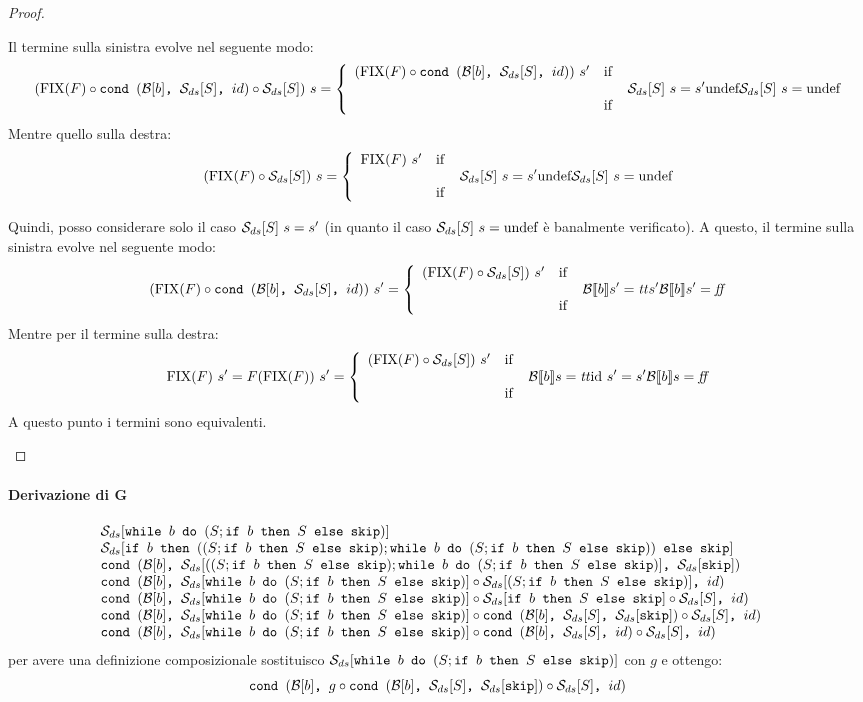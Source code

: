{\begin{proof}
\begin{itemize}
  Il termine sulla sinistra evolve nel seguente modo:
  $$
  (\fixp{F} \circ \cond{b}{\dsCtxt{S}}{id} \circ \dsCtxt{S})\ s =
    \caseFun{(\fixp{F} \circ
                 \cond{b}{\dsCtxt{S}}{id})\ s'}
            {\dsCtxt{S}\ s = s'}
            {\undefDS}
            {\dsCtxt{S}\ s = \undefDS}
  $$
  Mentre quello sulla destra:
  $$
  (\fixp{F} \circ \dsCtxt{S})\ s =
    \caseFun{\fixp{F}\ s'}
            {\dsCtxt{S}\ s = s'}
            {\undefDS}
            {\dsCtxt{S}\ s = \undefDS}
  $$

  Quindi, posso considerare solo il caso $\dsCtxt{S}\ s = s'$ (in quanto il
  caso $\dsCtxt{S}\ s = \undefDS$ è banalmente verificato). A questo, il
  termine sulla sinistra evolve nel seguente modo:
  $$
  (\fixp{F} \circ \cond{b}{\dsCtxt{S}}{id})\ s' =
    \caseFun{(\fixp{F} \circ \dsCtxt{S})\ s'}
            {\B{b}' = \semtrue}
            {s'}
            {\B{b}' = \semfalse}
  $$
  Mentre per il termine sulla destra:
  $$
  \fixp{F}\ s' = F(\fixp{F})\ s' =
    \caseFun{(\fixp{F} \circ \dsCtxt{S})\ s'}
            {\B{b} = \semtrue}
            {\idDS\ s' = s'}
            {\B{b} = \semfalse}
  $$
  A questo punto i termini sono equivalenti.
\end{itemize}

\end{proof}

\paragraph{Derivazione di G}
$$
\begin{array}{ll}
\dsCtxt{\wbS{b}{(S; \ifABC{b}{S}{\skipForFriends})}} & \\
\dsCtxt{\ifABC{b}{((S;  \ifABC{b}{S}{\skipForFriends}); \wbS{b}{(S; \ifABC{b}{S}{\skipForFriends})} )}{\skipForFriends}} & \\
\cond{b}{\dsCtxt{((S;  \ifABC{b}{S}{\skipForFriends}); \wbS{b}{(S; \ifABC{b}{S}{\skipForFriends})}}}{\dsCtxt{\skipForFriends}} \\
\cond{b}{\dsCtxt{\wbS{b}{(S; \ifABC{b}{S}{\skipForFriends})}} \circ \dsCtxt{(S;  \ifABC{b}{S}{\skipForFriends})}}{id} & \\
\cond{b}{\dsCtxt{\wbS{b}{(S; \ifABC{b}{S}{\skipForFriends})}} \circ \dsCtxt{\ifABC{b}{S}{\skipForFriends}} \circ \dsCtxt{S} }{id} & \\
\cond{b}{\dsCtxt{\wbS{b}{(S; \ifABC{b}{S}{\skipForFriends})}} \circ \cond{b}{\dsCtxt{S}}{\dsCtxt{\skipForFriends}} \circ \dsCtxt{S} }{id} & \\
\cond{b}{\dsCtxt{\wbS{b}{(S; \ifABC{b}{S}{\skipForFriends})}} \circ \cond{b}{\dsCtxt{S}}{id} \circ \dsCtxt{S} }{id} & \\
\end{array}
$$
per avere una definizione composizionale sostituisco $\dsCtxt{\wbS{b}{(S; \ifABC{b}{S}{\skipForFriends})}} $ con $g$ e ottengo:
$$
\cond{b}{g \circ \cond{b}{\dsCtxt{S}}{\dsCtxt{\skipForFriends}} \circ \dsCtxt{S} }{id}
$$
}
